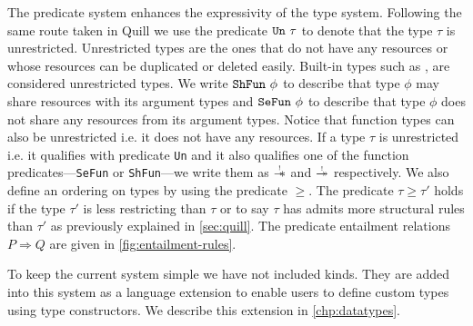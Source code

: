 The predicate system enhances the expressivity of the type system. Following the same route taken
in Quill \citep{morris_best_2016} we use the predicate $\texttt{Un}\ \tau$ to denote
that the type $\tau$ is unrestricted. Unrestricted types are the ones that do not have any resources or whose resources can
be duplicated or deleted easily. Built-in types such as ,  are considered unrestricted types.
We write $\texttt{ShFun}\ \phi$ to describe that type $\phi$ may share resources with its
argument types and  $\texttt{SeFun}\ \phi$ to describe that type $\phi$ does not share any resources from its argument types.
Notice that function types can also be unrestricted i.e. it does not have any resources. If a type $\tau$ is unrestricted i.e. it qualifies with predicate
\texttt{Un} and it also qualifies one of the function predicates---\texttt{SeFun} or \texttt{ShFun}---we write
them as $\tightoverset{\scalebox{0.5}{!}}{\sepimp}$ and $\tightoverset{\scalebox{0.5}{!}}{\shimp}$ respectively.
We also define an ordering on types by using the predicate $\geq$. The predicate $\tau \geq \tau'$ holds if the type $\tau'$
is less restricting than $\tau$ or to say $\tau$ has admits more structural rules than $\tau'$ as previously explained in \cref{sec:quill}.
The predicate entailment relations $P \Rightarrow Q$ are given in \cref{fig:entailment-rules}.

To keep the current system simple we have not included kinds. They are added into this system as a language extension
to enable users to define custom types using type constructors. We describe this extension in \cref{chp:datatypes}.

